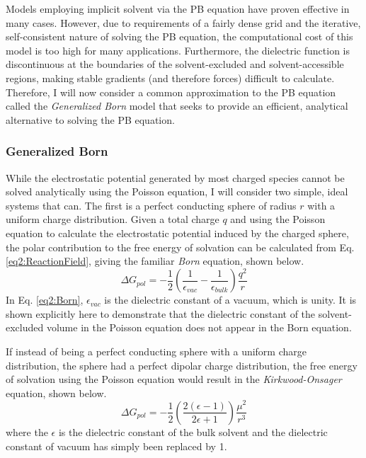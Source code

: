 Models employing implicit solvent via the PB equation have proven
effective in many cases. \cite{Klapper_Proteins_1986_v1_p47,
Gilson_JComputChem_1988_v9_p327, Baker_ProcNatlAcadSci_2001_v98_p10037,
Nielsen_Proteins_2001_v43_p403} However, due to requirements of a fairly dense
grid and the iterative, self-consistent nature of solving the PB equation, the
computational cost of this model is too high for many applications. Furthermore,
the dielectric function is discontinuous at the boundaries of the
solvent-excluded and solvent-accessible regions, making stable gradients (and
therefore forces) difficult to calculate.
\cite{Wang_ChemPhysLett_2009_v468_p112} Therefore, I will now consider a common
approximation to the PB equation called the \emph{Generalized Born} model that
seeks to provide an efficient, analytical alternative to solving the PB
equation.

\subsubsection{Generalized Born}

While the electrostatic potential generated by most charged species cannot be
solved analytically using the Poisson equation, I will consider two simple,
ideal systems that can. The first is a perfect conducting sphere of radius $r$
with a uniform charge distribution. Given a total charge $q$ and using the
Poisson equation to calculate the electrostatic potential induced by the charged
sphere, the polar contribution to the free energy of solvation can be calculated
from Eq. \ref{eq2:ReactionField}, giving the familiar \emph{Born} equation,
shown below. \cite{Cramer_Book_EssentialsCompChem_2004}
\begin{equation}
   \Delta G _ {pol} = - \frac 1 2 \left( \frac 1 {\epsilon_{vac}} - \frac 1
         {\epsilon_{bulk}} \right) \frac {q ^ 2} r
   \label{eq2:Born}
\end{equation}
In Eq. \ref{eq2:Born}, $\epsilon_{vac}$ is the dielectric constant of a vacuum,
which is unity.  It is shown explicitly here to demonstrate that the dielectric
constant of the solvent-excluded volume in the Poisson equation does not appear
in the Born equation.

If instead of being a perfect conducting sphere with a uniform charge
distribution, the sphere had a perfect dipolar charge distribution, the free
energy of solvation using the Poisson equation would result in the
\emph{Kirkwood-Onsager} equation, shown below.
\cite{Cramer_Book_EssentialsCompChem_2004}
\begin{equation}
   \Delta G _ {pol} = - \frac 1 2 \left ( \frac {2 ( \epsilon - 1 )} {2 \epsilon
         + 1} \right ) \frac {\mu ^ 2} {r ^ 3}
   \label{eq2:KirkwoodOnsager}
\end{equation}
where the $\epsilon$ is the dielectric constant of the bulk solvent and the
dielectric constant of vacuum has simply been replaced by 1.

